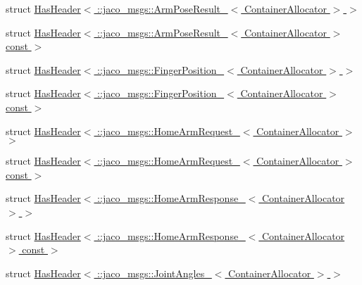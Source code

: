 \begin{DoxyCompactItemize}
\item 
struct \hyperlink{structros_1_1message__traits_1_1HasHeader_3_01_1_1jaco__msgs_1_1ArmPoseResult___3_01ContainerAllocator_01_4_01_4}{Has\+Header$<$ \+::jaco\+\_\+msgs\+::\+Arm\+Pose\+Result\+\_\+$<$ Container\+Allocator $>$ $>$}
\item 
struct \hyperlink{structros_1_1message__traits_1_1HasHeader_3_01_1_1jaco__msgs_1_1ArmPoseResult___3_01ContainerAllocator_01_4_01const_01_01_4}{Has\+Header$<$ \+::jaco\+\_\+msgs\+::\+Arm\+Pose\+Result\+\_\+$<$ Container\+Allocator $>$ const  $>$}
\item 
struct \hyperlink{structros_1_1message__traits_1_1HasHeader_3_01_1_1jaco__msgs_1_1FingerPosition___3_01ContainerAllocator_01_4_01_4}{Has\+Header$<$ \+::jaco\+\_\+msgs\+::\+Finger\+Position\+\_\+$<$ Container\+Allocator $>$ $>$}
\item 
struct \hyperlink{structros_1_1message__traits_1_1HasHeader_3_01_1_1jaco__msgs_1_1FingerPosition___3_01ContainerAllocator_01_4_01const_01_01_4}{Has\+Header$<$ \+::jaco\+\_\+msgs\+::\+Finger\+Position\+\_\+$<$ Container\+Allocator $>$ const  $>$}
\item 
struct \hyperlink{structros_1_1message__traits_1_1HasHeader_3_01_1_1jaco__msgs_1_1HomeArmRequest___3_01ContainerAllocator_01_4_01_4}{Has\+Header$<$ \+::jaco\+\_\+msgs\+::\+Home\+Arm\+Request\+\_\+$<$ Container\+Allocator $>$ $>$}
\item 
struct \hyperlink{structros_1_1message__traits_1_1HasHeader_3_01_1_1jaco__msgs_1_1HomeArmRequest___3_01ContainerAllocator_01_4_01const_01_01_4}{Has\+Header$<$ \+::jaco\+\_\+msgs\+::\+Home\+Arm\+Request\+\_\+$<$ Container\+Allocator $>$ const  $>$}
\item 
struct \hyperlink{structros_1_1message__traits_1_1HasHeader_3_01_1_1jaco__msgs_1_1HomeArmResponse___3_01ContainerAllocator_01_4_01_4}{Has\+Header$<$ \+::jaco\+\_\+msgs\+::\+Home\+Arm\+Response\+\_\+$<$ Container\+Allocator $>$ $>$}
\item 
struct \hyperlink{structros_1_1message__traits_1_1HasHeader_3_01_1_1jaco__msgs_1_1HomeArmResponse___3_01ContainerAllocator_01_4_01const_01_01_4}{Has\+Header$<$ \+::jaco\+\_\+msgs\+::\+Home\+Arm\+Response\+\_\+$<$ Container\+Allocator $>$ const  $>$}
\item 
struct \hyperlink{structros_1_1message__traits_1_1HasHeader_3_01_1_1jaco__msgs_1_1JointAngles___3_01ContainerAllocator_01_4_01_4}{Has\+Header$<$ \+::jaco\+\_\+msgs\+::\+Joint\+Angles\+\_\+$<$ Container\+Allocator $>$ $>$}
\item 

\end{DoxyCompactItemize}
